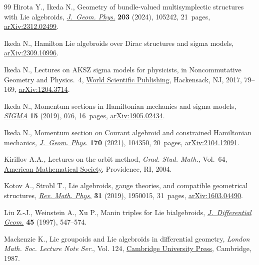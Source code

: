 \documentclass[10pt,a4paper]{amsart}
\numberwithin{equation}{section}
\begin{document}
\begin{thebibliography}{99}
Hirota Y., Ikeda N., Geometry of bundle-valued multisymplectic structures with
 {L}ie algebroids, \href{https://doi.org/10.1016/j.geomphys.2024.105242}{\textit{J.~Geom. Phys.}} \textbf{203} (2024), 105242,
 21~pages, \href{https://arxiv.org/abs/2312.02499}{arXiv:2312.02499}.

Ikeda N., Hamilton {L}ie algebroids over {D}irac structures and sigma models,
 \href{https://arxiv.org/abs/2309.10996}{arXiv:2309.10996}.

Ikeda N., Lectures on {AKSZ} sigma models for physicists, in Noncommutative
 {G}eometry and {P}hysics.~4, \href{https://doi.org/10.1142/9789813144613_0003}{World Scientific Publishing}, Hackensack, NJ,
 2017, 79--169, \href{https://arxiv.org/abs/1204.3714}{arXiv:1204.3714}.

Ikeda N., Momentum sections in {H}amiltonian mechanics and sigma models,
 \href{https://doi.org/10.3842/SIGMA.2019.076}{\textit{SIGMA}} \textbf{15} (2019), 076, 16~pages, \href{https://arxiv.org/abs/1905.02434}{arXiv:1905.02434}.

Ikeda N., Momentum section on {C}ourant algebroid and constrained {H}amiltonian
 mechanics, \href{https://doi.org/10.1016/j.geomphys.2021.104350}{\textit{J.~Geom. Phys.}} \textbf{170} (2021), 104350, 20~pages,
 \href{https://arxiv.org/abs/2104.12091}{arXiv:2104.12091}.

Kirillov A.A., Lectures on the orbit method, \textit{Grad. Stud. Math.},
 Vol.~64, \href{https://doi.org/10.1090/gsm/064}{American Mathematical Society}, Providence, RI, 2004.

Kotov A., Strobl T., Lie algebroids, gauge theories, and compatible geometrical
 structures, \href{https://doi.org/10.1142/S0129055X19500156}{\textit{Rev. Math. Phys.}} \textbf{31} (2019), 1950015, 31~pages,
 \href{https://arxiv.org/abs/1603.04490}{arXiv:1603.04490}.

Liu Z.-J., Weinstein A., Xu P., Manin triples for {L}ie bialgebroids,
 \href{https://doi.org/10.4310/jdg/1214459842}{\textit{J.~Differential Geom.}} \textbf{45} (1997), 547--574.

Mackenzie K., Lie groupoids and {L}ie algebroids in differential geometry,
 \textit{London Math. Soc. Lecture Note Ser.}, Vol. 124, \href{https://doi.org/10.1017/CBO9780511661839}{Cambridge University
 Press}, Cambridge, 1987.


\end{thebibliography}
\end{document}
